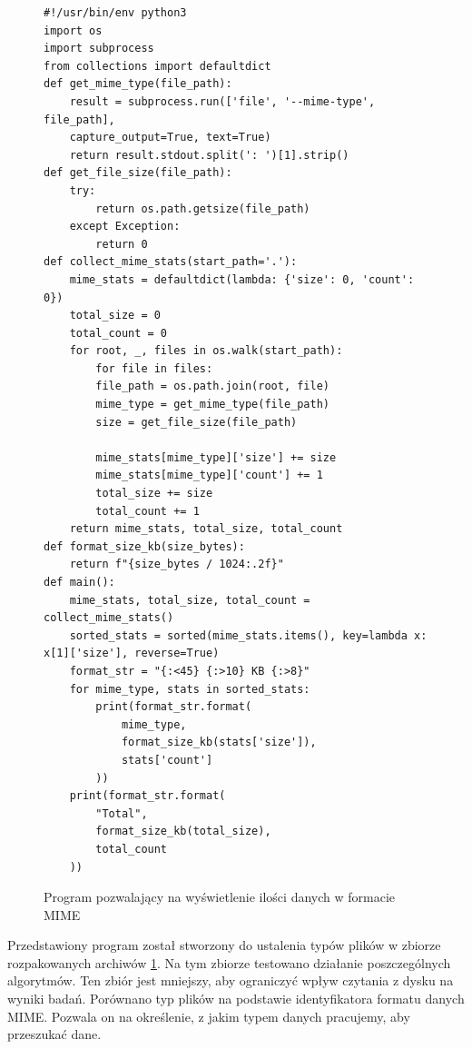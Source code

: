 \begin{figure}[ht]
    \centering
    \begin{lstlisting}
#!/usr/bin/env python3
import os
import subprocess
from collections import defaultdict
def get_mime_type(file_path):
    result = subprocess.run(['file', '--mime-type', file_path], 
    capture_output=True, text=True)
    return result.stdout.split(': ')[1].strip()
def get_file_size(file_path):
    try:
        return os.path.getsize(file_path)
    except Exception:
        return 0
def collect_mime_stats(start_path='.'):
    mime_stats = defaultdict(lambda: {'size': 0, 'count': 0})
    total_size = 0
    total_count = 0
    for root, _, files in os.walk(start_path):
        for file in files:
        file_path = os.path.join(root, file)
        mime_type = get_mime_type(file_path)
        size = get_file_size(file_path)
        
        mime_stats[mime_type]['size'] += size
        mime_stats[mime_type]['count'] += 1
        total_size += size
        total_count += 1
    return mime_stats, total_size, total_count
def format_size_kb(size_bytes):
    return f"{size_bytes / 1024:.2f}"
def main():
    mime_stats, total_size, total_count = collect_mime_stats()
    sorted_stats = sorted(mime_stats.items(), key=lambda x: x[1]['size'], reverse=True)
    format_str = "{:<45} {:>10} KB {:>8}"
    for mime_type, stats in sorted_stats:
        print(format_str.format(
            mime_type,
            format_size_kb(stats['size']),
            stats['count']
        ))
    print(format_str.format(
        "Total",
        format_size_kb(total_size),
        total_count
    ))
    \end{lstlisting}
    \caption{Program pozwalający na wyświetlenie ilości danych w formacie MIME}
    \label{fig:code:pythonMimeProgram}
\end{figure}

Przedstawiony program został stworzony do ustalenia typów plików w zbiorze 
rozpakowanych archiwów \ref{fig:code:pythonMimeProgram}. Na tym zbiorze testowano działanie poszczególnych algorytmów.
Ten zbiór jest mniejszy, aby ograniczyć wpływ czytania z dysku na wyniki badań. 
Porównano typ plików na podstawie identyfikatora formatu danych MIME. Pozwala
on na określenie, z jakim typem danych pracujemy, aby przeszukać dane.


